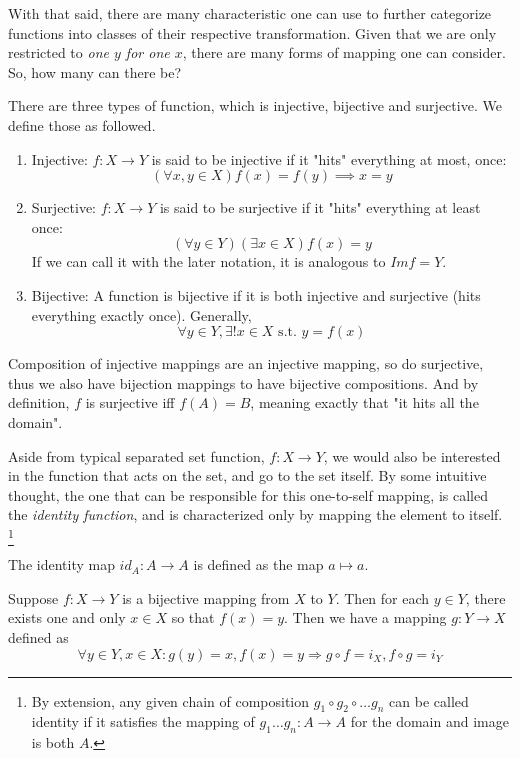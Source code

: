 With that said, there are many characteristic one can use to further categorize functions into classes of their respective transformation. Given that we are only restricted to \textit{one $y$ for one $x$}, there are many forms of mapping one can consider. So, how many can there be? 
\begin{definition}[Types]
    There are three types of function, which is injective, bijective and surjective. We define those as followed. 
    \begin{enumerate}
        \item Injective: $f: X\to Y$ is said to be injective if it "hits" everything at most, once: $$(\forall x,y\in X)f(x)=f(y)\implies x=y$$
        \item Surjective: $f:X\to Y$ is said to be surjective if it "hits" everything at least once: $$(\forall y\in Y)(\exists x\in X)f(x)=y$$ If we can call it with the later notation, it is analogous to $Imf=Y$. 
        \item Bijective: A function is bijective if it is both injective and surjective (hits everything exactly once). Generally, $$\displaystyle \forall y\in Y,\exists !x\in X{\text{ s.t. }}y=f(x)$$
    \end{enumerate}
\end{definition}
Composition of injective mappings are an injective mapping, so do surjective, thus we also have bijection mappings to have bijective compositions. And by definition, $f$ is surjective iff $f(A)=B$, meaning exactly that "it hits all the domain". 

Aside from typical separated set function, $f: X\to Y$, we would also be interested in the function that acts on the set, and go to the set itself. By some intuitive thought, the one that can be responsible for this one-to-self mapping, is called the \textit{identity function}, and is characterized only by mapping the element to itself. \footnote{By extension, any given chain of composition $g_1 \circ g_2 \circ \dots g_{n}$ can be called identity if it satisfies the mapping of $g_{1}\dots g_n : A\to A$ for the domain and image is both $A$.}
\begin{definition}[Identity]
    The identity map $id_{A}: A \to A$ is defined as the map $a\mapsto a$. 
\end{definition}

Suppose $f: X \longrightarrow Y$ is a bijective mapping from $X$ to $Y$. Then for each $y \in Y$, there exists one and only $x\in X$ so that $f(x)=y$. Then we have a mapping $g: Y \longrightarrow X$ defined as $$\forall y \in Y, x \in X: g(y) = x, f(x) = y \Longrightarrow g \circ f= i_{X}, f \circ g = i_{Y}$$

